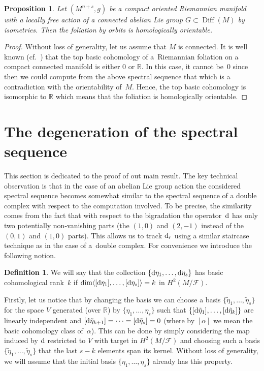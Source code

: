 \documentclass[pdftex]{sigma}
\numberwithin{equation}{section}
\newtheorem{prop}[tw]{Proposition}
\theoremstyle{definition}
\newtheorem{defi}[tw]{Definition}
\begin{document}
\begin{prop} Let $(M^{n+s},g)$ be a compact oriented Riemannian manifold with a locally free action of a connected abelian Lie group $G\subset \operatorname{Diff}(M)$ by isometries. Then the foliation by orbits is homologically orientable.
\end{prop}

\begin{proof} Without loss of generality, let us assume that $M$ is connected. It is well known (cf.~\cite{E1}) that the top basic cohomology of a~Riemannian foliation on a compact connected manifold is either $0$ or $\mathbb{R}$. In this case, it cannot be~$0$ since then we could compute from the above spectral sequence that  which is a contradiction with the orientability of~$M$. Hence, the top basic cohomology is isomorphic to $\mathbb{R}$ which means that the foliation is homologically orientable.
\end{proof}

\section{The degeneration of the spectral sequence}%
This section is dedicated to the proof of out main result. The key technical observation is that in the case of an abelian Lie group action the considered spectral sequence becomes somewhat similar to the spectral sequence of a double complex with respect to the computation involved. To be precise, the similarity comes from the fact that with respect to the bigradation the operator~${\rm d}$ has only two potentially non-vanishing parts (the $(1,0)$ and $(2,-1)$ instead of the $(0,1)$ and $(1,0)$ parts). This allows us to track ${\rm d}_r$ using a similar staircase technique as in the case of a~double complex. For convenience we introduce the following notion.

\begin{defi}We will say that the collection $\{{\rm d}\eta_1,\dots,{\rm d}\eta_s\}$ has basic cohomological rank~$k$ if $\dim \langle [{\rm d}\eta_1], \dots, [{\rm d}\eta_s] \rangle = k$ in $H^2(M\slash\mathcal{F})$.
\end{defi}

 Firstly, let us notice that by changing the basis we can choose a basis $\{\tilde{\eta}_1,\dots,\tilde{\eta}_s\}$ for the space $V$ generated (over $\mathbb{R}$) by $\{\eta_1,\dots,\eta_s\}$ such that $\{[{\rm d}\tilde{\eta}_1],\dots,[{\rm d}\tilde{\eta}_k]\}$ are linearly independent and $[{\rm d}\tilde{\eta}_{k+1}]=\cdots =[{\rm d}\tilde{\eta}_s]=0$ (where by $[\alpha]$ we mean the basic cohomology class of~$\alpha$). This can be done by simply considering the map induced by ${\rm d}$ restricted to $V$ with target in $H^2(M\slash\mathcal{F})$ and choosing such a basis $\{\tilde{\eta}_1,\dots,\tilde{\eta}_s\}$ that the last $s-k$ elements span its kernel. Without loss of generality, we will assume that the initial basis $\{\eta_1,\dots,\eta_s\}$ already has this property.
\end{document}
